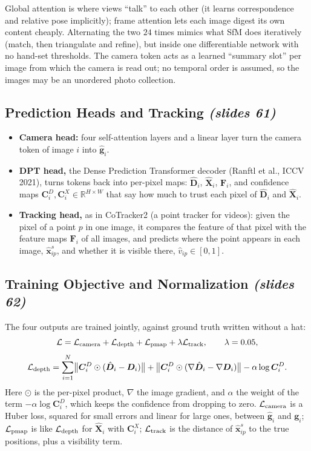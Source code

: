 \documentclass[11pt,a4paper]{article}
\newcommand{\slr}[1]{\texorpdfstring{\emph{(slides #1)}}{(slides #1)}}
\newcommand{\R}{\mathbb{R}}
\begin{document}
\begin{intuition}
Global attention is where views ``talk'' to each other (it learns correspondence and relative pose implicitly); frame attention lets each image digest its own content cheaply. Alternating the two $24$ times mimics what SfM does iteratively (match, then triangulate and refine), but inside one differentiable network with no hand-set thresholds. The camera token acts as a learned ``summary slot'' per image from which the camera is read out; no temporal order is assumed, so the images may be an unordered photo collection.
\end{intuition}

\subsection{Prediction Heads and Tracking \slr{61}}
\begin{itemize}
\item \textbf{Camera head:} four self-attention layers and a linear layer turn the camera token of image $i$ into $\hat{\bm g}_i$.
\item \textbf{DPT head,} the Dense Prediction Transformer decoder (Ranftl et al., ICCV 2021), turns tokens back into per-pixel maps: $\hat{\bm D}_i$, $\hat{\bm X}_i$, $\bm F_i$, and confidence maps $\bm C^D_i,\bm C^X_i\in\R^{H\times W}$ that say how much to trust each pixel of $\hat{\bm D}_i$ and $\hat{\bm X}_i$.
\item \textbf{Tracking head,} as in CoTracker2 (a point tracker for videos): given the pixel of a point $p$ in one image, it compares the feature of that pixel with the feature maps $\bm F_i$ of all images, and predicts where the point appears in each image, $\hat{\bm x}^s_{ip}$, and whether it is visible there, $\hat v_{ip}\in[0,1]$.
\end{itemize}

\subsection{Training Objective and Normalization \slr{62}}
The four outputs are trained jointly, against ground truth written without a hat:
\[
\mathcal L=\mathcal L_{\rm camera}+\mathcal L_{\rm depth}+\mathcal L_{\rm pmap}+\lambda\mathcal L_{\rm track},\qquad\lambda=0.05,
\]
\[
\mathcal L_{\rm depth}=\sum_{i=1}^N\bigl\lVert\bm C^D_i\odot(\hat{\bm D}_i-\bm D_i)\bigr\rVert+\bigl\lVert\bm C^D_i\odot(\nabla\hat{\bm D}_i-\nabla\bm D_i)\bigr\rVert-\alpha\log\bm C^D_i .
\]
Here $\odot$ is the per-pixel product, $\nabla$ the image gradient, and $\alpha$ the weight of the term $-\alpha\log\bm C^D_i$, which keeps the confidence from dropping to zero. $\mathcal L_{\rm camera}$ is a Huber loss, squared for small errors and linear for large ones, between $\hat{\bm g}_i$ and $\bm g_i$; $\mathcal L_{\rm pmap}$ is like $\mathcal L_{\rm depth}$ for $\hat{\bm X}_i$ with $\bm C^X_i$; $\mathcal L_{\rm track}$ is the distance of $\hat{\bm x}^s_{ip}$ to the true positions, plus a visibility term.
\end{document}
